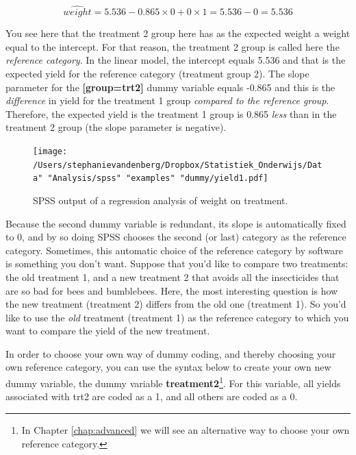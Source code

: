\documentclass[]{book}\usepackage[]{graphicx}\usepackage[]{color}
\begin{document}
\begin{equation}
\widehat{weight}= 5.536 -0.865 \times 0 + 0 \times 1  = 5.536 - 0 = 5.536
\end{equation}


You see here that the treatment 2 group here has as the expected weight a weight equal to the intercept. For that reason, the treatment 2 group is called here the \textit{reference category}. In the linear model, the intercept equals 5.536 and that is the expected yield for the reference category (treatment group 2). The slope parameter for the \textbf{[group=trt2]} dummy variable equals -0.865 and this is the \textit{difference} in yield for the treatment 1 group \textit{compared to the reference group}. Therefore, the expected yield is the treatment 1 group is 0.865 \textit{less} than in the treatment 2 group (the slope parameter is negative). 

\begin{figure}[h]
    \begin{center}
       \texttt{[image: /Users/stephanievandenberg/Dropbox/Statistiek\_Onderwijs/Data" "Analysis/spss" "examples" "dummy/yield1.pdf]}
    \end{center}
 \caption{SPSS output of a regression analysis of weight on treatment.}
 \label{fig:dummy_10}
\end{figure}


Because the second dummy variable is redundant, its slope is automatically fixed to 0, and by so doing SPSS chooses the second (or last) category as the reference category. Sometimes, this automatic choice of the reference category by software is something you don't want. Suppose that you'd like to compare two treatments: the old treatment 1, and a new treatment 2 that avoids all the insecticides that are so bad for bees and bumblebees. Here, the most interesting question is how the new treatment (treatment 2) differs from the old one (treatment 1). So you'd like to use the \textit{old} treatment (treatment 1) as the reference category to which you want to compare the yield of the new treatment.

In order to choose your own way of dummy coding, and thereby choosing your own reference category, you can use the syntax below to create your own new dummy variable, the dummy variable \textbf{treatment2}\footnote{In Chapter \ref{chap:advanced} we will see an alternative way to choose your own reference category.}. For this variable, all yields associated with trt2 are coded as a 1, and all others are coded as a 0.
\end{document}
